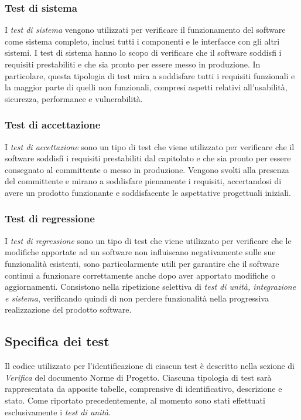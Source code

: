 \subsubsection{Test di sistema}

I \textit{test di sistema} vengono utilizzati per verificare il funzionamento del software come sistema
completo, inclusi tutti i componenti e le interfacce con gli altri sistemi. I test di sistema hanno lo
scopo di verificare che il software soddisfi i requisiti prestabiliti e che sia pronto per essere messo in
produzione. In particolare, questa tipologia di test mira a soddisfare tutti i requisiti funzionali e la maggior parte di quelli non funzionali, compresi aspetti relativi all’usabilità, sicurezza,
performance e vulnerabilità.

\subsubsection{Test di accettazione}

I \textit{test di accettazione} sono un tipo di test che viene utilizzato per verificare che il software soddisfi i requisiti prestabiliti dal capitolato e che sia pronto per essere consegnato al committente o messo in produzione.
Vengono svolti alla presenza del committente e mirano a soddisfare pienamente i requisiti,
accertandosi di avere un prodotto funzionante e soddisfacente le aspettative progettuali iniziali.

\subsubsection{Test di regressione}

I \textit{test di regressione} sono un tipo di test che viene utilizzato per verificare che le modifiche apportate ad un software non influiscano negativamente sulle sue funzionalità esistenti, sono particolarmente utili per garantire che il software continui a funzionare correttamente anche dopo aver apportato modifiche o aggiornamenti.
Consistono nella ripetizione selettiva di \textit{test di unità, integrazione e sistema}, verificando quindi di non perdere funzionalità nella progressiva realizzazione del prodotto software.

\pagebreak

\subsection{Specifica dei test}
Il codice utilizzato per l’identificazione di ciascun test è descritto nella sezione di \textit{Verifica} del documento Norme di Progetto. Ciascuna tipologia di test sarà rappresentata da apposite tabelle, comprensive di identificativo, descrizione e stato. Come riportato precedentemente, al momento sono stati effettuati esclusivamente i \textit{test di unità}.

